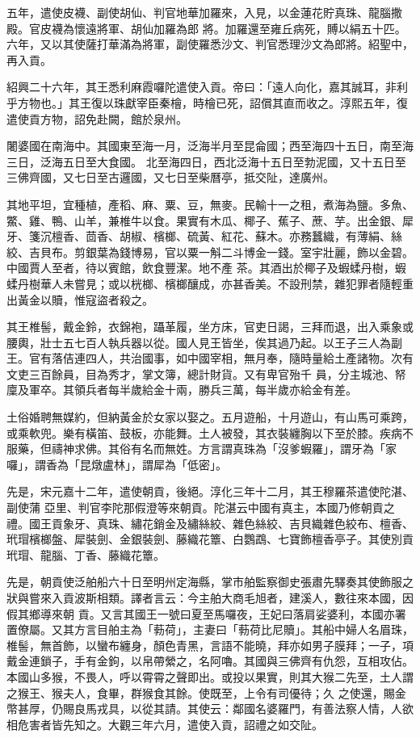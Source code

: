 \begin{pinyinscope}
 五年，遣使皮襪、副使胡仙、判官地華加羅來，入見，以金蓮花貯真珠、龍腦撒殿。官皮襪為懷遠將軍、胡仙加羅為郎
 將。加羅還至雍丘病死，賻以絹五十匹。六年，又以其使薩打華滿為將軍，副使羅悉沙文、判官悉理沙文為郎將。紹聖中，再入貢。



 紹興二十六年，其王悉利麻霞囉陀遣使入貢。帝曰：「遠人向化，嘉其誠耳，非利乎方物也。」其王復以珠獻宰臣秦檜，時檜已死，詔償其直而收之。淳熙五年，復遣使貢方物，詔免赴闕，館於泉州。



 闍婆國在南海中。其國東至海一月，泛海半月至昆侖國；西至海四十五日，南至海三日，泛海五日至大食國。
 北至海四日，西北泛海十五日至勃泥國，又十五日至三佛齊國，又七日至古邏國，又七日至柴曆亭，抵交阯，達廣州。



 其地平坦，宜種植，產稻、麻、粟、豆，無麥。民輸十一之租，煮海為鹽。多魚、鱉、雞、鴨、山羊，兼椎牛以食。果實有木瓜、椰子、蕉子、蔗、芋。出金銀、犀牙、箋沉檀香、茴香、胡椒、檳榔、硫黃、紅花、蘇木。亦務蠶織，有薄絹、絲絞、吉貝布。剪銀葉為錢博易，官以粟一斛二斗博金一錢。室宇壯麗，飾以金碧。中國賈人至者，待以賓館，飲食豐潔。地不產
 茶。其酒出於椰子及蝦蝚丹樹，蝦蝚丹樹華人未嘗見；或以桄榔、檳榔釀成，亦甚香美。不設刑禁，雜犯罪者隨輕重出黃金以贖，惟寇盜者殺之。



 其王椎髻，戴金鈴，衣錦袍，躡革履，坐方床，官吏日謁，三拜而退，出入乘象或腰輿，壯士五七百人執兵器以從。國人見王皆坐，俟其過乃起。以王子三人為副王。官有落佶連四人，共治國事，如中國宰相，無月奉，隨時量給土產諸物。次有文吏三百餘員，目為秀才，掌文簿，總計財貨。又有卑官殆千
 員，分主城池、帑廩及軍卒。其領兵者每半歲給金十兩，勝兵三萬，每半歲亦給金有差。



 土俗婚聘無媒約，但納黃金於女家以娶之。五月遊船，十月遊山，有山馬可乘跨，或乘軟兜。樂有橫笛、鼓板，亦能舞。土人被發，其衣裝纏胸以下至於膝。疾病不服藥，但禱神求佛。其俗有名而無姓。方言謂真珠為「沒爹蝦羅」，謂牙為「家囉」，謂香為「昆燉盧林」，謂犀為「低密」。



 先是，宋元嘉十二年，遣使朝貢，後絕。淳化三年十二月，其王穆羅茶遣使陀湛、副使蒲
 亞里、判官李陀那假澄等來朝貢。陀湛云中國有真主，本國乃修朝貢之禮。國王貢象牙、真珠、繡花銷金及繡絲絞、雜色絲絞、吉貝織雜色絞布、檀香、玳瑁檳榔盤、犀裝劍、金銀裝劍、藤織花簟、白鸚鵡、七寶飾檀香亭子。其使別貢玳瑁、龍腦、丁香、藤織花簟。



 先是，朝貢使泛舶船六十日至明州定海縣，掌市舶監察御史張肅先驛奏其使飾服之狀與嘗來入貢波斯相類。譯者言云：今主舶大商毛旭者，建溪人，數往來本國，因假其鄉導來朝
 貢。又言其國王一號曰夏至馬囉夜，王妃曰落肩娑婆利，本國亦署置僚屬。又其方言目舶主為「葧荷」，主妻曰「葧荷比尼贖」。其船中婦人名眉珠，椎髻，無首飾，以蠻布纏身，顏色青黑，言語不能曉，拜亦如男子膜拜；一子，項戴金連鎖子，手有金鉤，以帛帶縈之，名阿嚕。其國與三佛齊有仇怨，互相攻佔。本國山多猴，不畏人，呼以霄霄之聲即出。或投以果實，則其大猴二先至，土人謂之猴王、猴夫人，食畢，群猴食其餘。使既至，上令有司優待；久
 之使還，賜金幣甚厚，仍賜良馬戎具，以從其請。其使云：鄰國名婆羅門，有善法察人情，人欲相危害者皆先知之。大觀三年六月，遣使入貢，詔禮之如交阯。




\end{pinyinscope}
